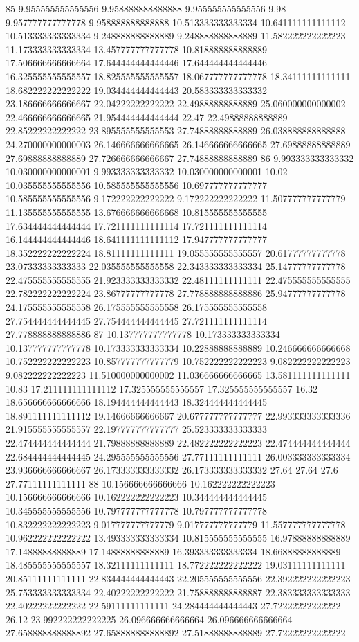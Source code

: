 85 9.955555555555556 9.958888888888888 9.955555555555556 9.98 9.957777777777778 9.958888888888888 10.513333333333334 10.641111111111112 10.513333333333334 9.248888888888889 9.248888888888889 11.582222222222223 11.173333333333334 13.457777777777778 10.818888888888889 17.506666666666664 17.644444444444446 17.644444444444446 16.325555555555557 18.825555555555557 18.067777777777778 18.34111111111111 18.682222222222222 19.034444444444443 20.583333333333332 23.186666666666667 22.04222222222222 22.49888888888889 25.060000000000002 22.466666666666665 21.954444444444444 22.47 22.49888888888889 22.85222222222222 23.895555555555553 27.74888888888889 26.038888888888888 24.270000000000003 26.146666666666665 26.146666666666665 27.69888888888889 27.69888888888889 27.726666666666667 27.74888888888889
86 9.993333333333332 10.030000000000001 9.993333333333332 10.030000000000001 10.02 10.035555555555556 10.585555555555556 10.697777777777777 10.585555555555556 9.172222222222222 9.172222222222222 11.507777777777779 11.135555555555555 13.676666666666668 10.815555555555555 17.634444444444444 17.721111111111114 17.721111111111114 16.144444444444446 18.641111111111112 17.947777777777777 18.352222222222224 18.81111111111111 19.055555555555557 20.61777777777778 23.07333333333333 22.035555555555558 22.343333333333334 25.14777777777778 22.475555555555555 21.923333333333332 22.48111111111111 22.475555555555555 22.782222222222224 23.86777777777778 27.778888888888886 25.94777777777778 24.175555555555558 26.175555555555558 26.175555555555558 27.754444444444445 27.754444444444445 27.721111111111114 27.778888888888886
87 10.137777777777778 10.173333333333334 10.137777777777778 10.173333333333334 10.22888888888889 10.246666666666668 10.752222222222223 10.857777777777779 10.752222222222223 9.082222222222223 9.082222222222223 11.510000000000002 11.036666666666665 13.581111111111111 10.83 17.211111111111112 17.325555555555557 17.325555555555557 16.32 18.656666666666666 18.194444444444443 18.324444444444445 18.891111111111112 19.14666666666667 20.677777777777777 22.993333333333336 21.915555555555557 22.197777777777777 25.523333333333333 22.474444444444444 21.79888888888889 22.482222222222223 22.474444444444444 22.684444444444445 24.295555555555556 27.77111111111111 26.003333333333334 23.936666666666667 26.173333333333332 26.173333333333332 27.64 27.64 27.6 27.77111111111111
88 10.156666666666666 10.162222222222223 10.156666666666666 10.162222222222223 10.344444444444445 10.345555555555556 10.797777777777778 10.797777777777778 10.832222222222223 9.017777777777779 9.017777777777779 11.557777777777778 10.962222222222222 13.493333333333334 10.815555555555555 16.97888888888889 17.14888888888889 17.14888888888889 16.393333333333334 18.66888888888889 18.485555555555557 18.32111111111111 18.772222222222222 19.03111111111111 20.85111111111111 22.834444444444443 22.205555555555556 22.392222222222223 25.753333333333334 22.40222222222222 21.758888888888887 22.383333333333333 22.40222222222222 22.59111111111111 24.284444444444443 27.72222222222222 26.12 23.992222222222225 26.096666666666664 26.096666666666664 27.658888888888892 27.658888888888892 27.51888888888889 27.72222222222222
